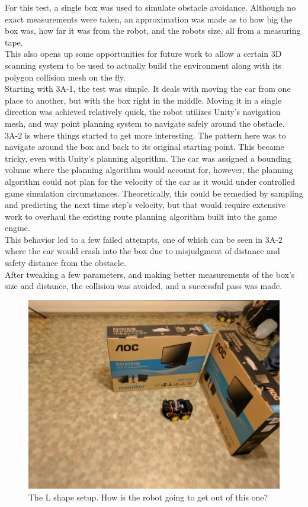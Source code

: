 \documentclass[10pt,a4paper]{article}
\begin{document}
	For this test, a single box was used to simulate obstacle avoidance. Although no exact measurements were taken, an approximation was made as to how big the box was, how far it was from the robot, and the robots size, all from a measuring tape.
	\\
	This also opens up some opportunities for future work to allow a certain 3D scanning system to be used to actually build the environment along with its polygon collision mesh on the fly.
	\\
	Starting with 3A-1, the test was simple. It deals with moving the car from one place to another, but with the box right in the middle. Moving it in a single direction was achieved relatively quick, the robot utilizes Unity's navigation mesh, and way point planning system to navigate safely around the obstacle.
	\\
	3A-2 is where things started to get more interesting. The pattern here was to navigate around the box and back to its original starting point. This became tricky, even with Unity's planning algorithm. The car was assigned a bounding volume where the planning algorithm would account for, however, the planning algorithm could not plan for the velocity of the car as it would under controlled game simulation circumstances. Theoretically, this could be remedied by sampling and predicting the next time step's velocity, but that would require extensive work to overhaul the existing route planning algorithm built into the game engine.
	\\
	This behavior led to a few failed attempts, one of which can be seen in 3A-2 where the car would crash into the box due to misjudgment of distance and safety distance from the obstacle.
	\\
	After tweaking a few parameters, and making better measurements of the box's size and distance, the collision was avoided, and a successful pass was made.
	
	\begin{figure}
		\centering
		\includegraphics[width=.6\textwidth]{wall_setup.jpg}
		\caption{The L shape setup. How is the robot going to get out of this one?}
		\label{fig:photo_fort}
	\end{figure}
	
\end{document}
